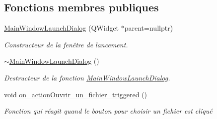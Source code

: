 \subsection*{Fonctions membres publiques}
\begin{DoxyCompactItemize}
\item 
\hyperlink{classMainWindowLaunchDialog_a9f7ef6d5da5eff43adb6ea835f0790d0}{Main\+Window\+Launch\+Dialog} (Q\+Widget $\ast$parent=nullptr)
\begin{DoxyCompactList}\small\item\em Constructeur de la fenêtre de lancement. \end{DoxyCompactList}\item 
\hyperlink{classMainWindowLaunchDialog_abf8a63fe899ba6d8fcbdf179122dfcb7}{$\sim$\+Main\+Window\+Launch\+Dialog} ()
\begin{DoxyCompactList}\small\item\em Destructeur de la fonction \hyperlink{classMainWindowLaunchDialog}{Main\+Window\+Launch\+Dialog}. \end{DoxyCompactList}\item 
void \hyperlink{classMainWindowLaunchDialog_a0cfb74c6cb22582d2b1047332008b9c0}{on\+\_\+action\+Ouvrir\+\_\+un\+\_\+fichier\+\_\+triggered} ()
\begin{DoxyCompactList}\small\item\em Fonction qui réagit quand le bouton pour choisir un fichier est cliqué \end{DoxyCompactList}\end{DoxyCompactItemize}
